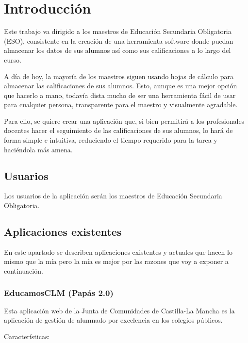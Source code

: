 \chapter{Introducción}
\label{cap:Introduccion}

Este trabajo va dirigido a los maestros de Educación Secundaria Obligatoria (ESO), consistente en la creación de una herramienta software donde puedan almacenar los datos de sus alumnos así como sus calificaciones a lo largo del curso.

A día de hoy, la mayoría de los maestros siguen usando hojas de cálculo para almacenar las calificaciones de sus alumnos. Esto, aunque es una mejor opción que hacerlo a mano, todavía dista mucho de ser una herramienta fácil de usar para cualquier persona, transparente para el maestro y visualmente agradable.

Para ello, se quiere crear una aplicación que, si bien permitirá a los profesionales docentes hacer el seguimiento de las calificaciones de sus alumnos, lo hará de forma simple e intuitiva, reduciendo el tiempo requerido para la tarea y haciéndola más amena.

\section{Usuarios}

Los usuarios de la aplicación serán los maestros de Educación Secundaria Obligatoria.

\section{Aplicaciones existentes}

En este apartado se describen aplicaciones existentes y actuales que hacen lo mismo que la mía pero la mía es mejor por las razones que voy a exponer a continuación.

\subsection{EducamosCLM (Papás 2.0)}

Esta aplicación web de la Junta de Comunidades de Castilla-La Mancha es la aplicación de gestión de alumnado por excelencia en los colegios públicos. 

Características:

